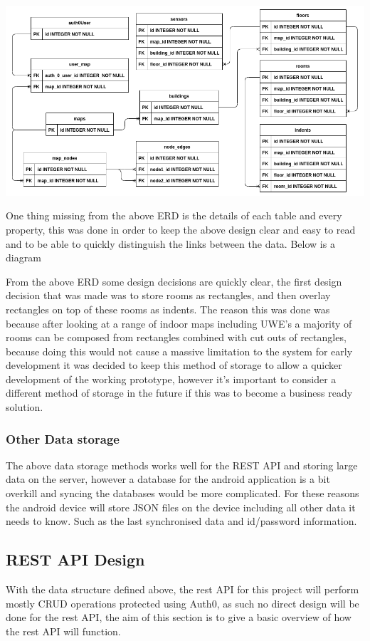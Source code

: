 \begin{center}
\includegraphics[width=\linewidth]{./images/designs/erd.png}\\
\end{center}
One thing missing from the above ERD is the details of each table and every property, this was done in order to keep the above design clear and easy to read and to be able to quickly distinguish the links between the data. Below is a diagram

From the above ERD some design decisions are quickly clear, the first design decision that was made was to store rooms as rectangles, and then overlay rectangles on top of these rooms as indents. The reason this was done was because after looking at a range of indoor maps including UWE's a majority of rooms can be composed from rectangles combined with cut outs of rectangles, because doing this would not cause a massive limitation to the system for early development it was decided to keep this method of storage to allow a quicker development of the working prototype, however it's important to consider a different method of storage in the future if this was to become a business ready solution. 

\subsubsection{Other Data storage}
The above data storage methods works well for the REST API and storing large data on the server, however a database for the android application is a bit overkill and syncing the databases would be more complicated. For these reasons the android device will store JSON files on the device including all other data it needs to know. Such as the last synchronised data and id/password information.
\newpage
\subsection{REST API Design}
With the data structure defined above, the rest API for this project will perform mostly CRUD operations protected using Auth0, as such no direct design will be done for the rest API, the aim of this section is to give a basic overview of how the rest API will function.

